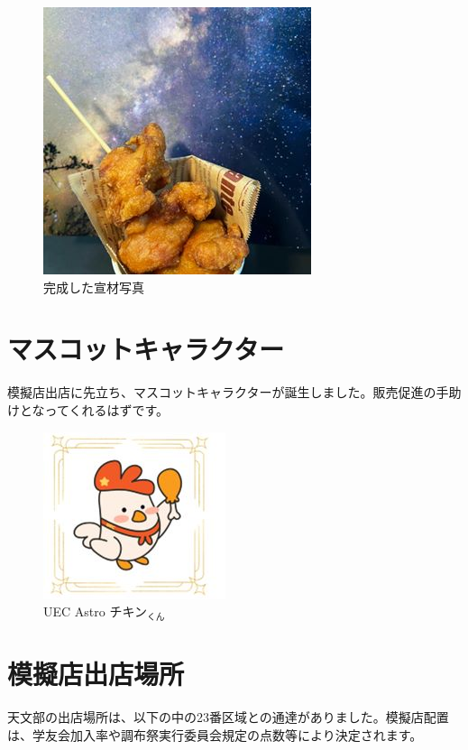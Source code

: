 \documentclass[../super_nova_20yy]{subfiles}
\begin{document}
\begin{figure}[H]
\begin{minipage}[t]{0.4\columnwidth}
    \includegraphics[width=\columnwidth]{画像3.jpg}
    \caption{完成した宣材写真}
    \label{fig:3}
  \end{minipage}
\end{figure}
\section{マスコットキャラクター}
模擬店出店に先立ち、マスコットキャラクターが誕生しました。販売促進の手助けとなってくれるはずです。

\begin{figure}[H]
  \centering
  \includegraphics[width=.5\columnwidth]{画像4.jpg}
  \caption{UEC Astro チキン$_\text{くん}$}
  \label{fig:4}
\end{figure}
\section{模擬店出店場所}
天文部の出店場所は、以下の中の23番区域との通達がありました。模擬店配置は、学友会加入率や調布祭実行委員会規定の点数等により決定されます。
\end{document}
